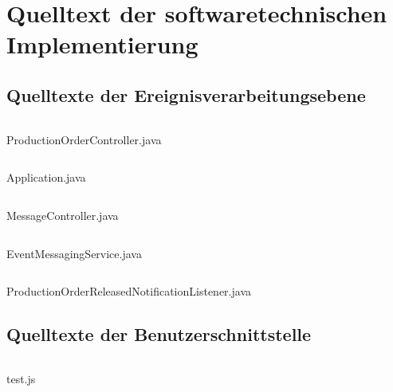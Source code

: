 \chapter{Quelltext der softwaretechnischen Implementierung}\label{ah:coding}

\tocless\section{Quelltexte der Ereignisverarbeitungsebene}\label{ah:approuter}

\begin{algorithm}[H]
\centering 
\inputminted[linenos]{java}{code/ProductionOrderController.java}
\caption{ProductionOrderController.java}
\label{code:EventMessagingService.java}
\end{algorithm}

\begin{algorithm}[H]
\centering 
\inputminted[linenos]{java}{code/Application.java}
\caption{Application.java}
\label{code:Application.java}
\end{algorithm}

\begin{algorithm}[H]
\centering 
\inputminted[linenos]{java}{code/MessageController.java}
\caption{MessageController.java}
\label{code:MessageController.java}
\end{algorithm}

\begin{algorithm}[H]
\centering 
\inputminted[linenos]{java}{code/EventMessagingService.java}
\caption{EventMessagingService.java}
\label{code:EventMessagingService.java}
\end{algorithm}

\begin{algorithm}[H]
\centering 
\inputminted[linenos]{java}{code/ProductionOrderReleasedNotificationListener.java}
\caption{ProductionOrderReleasedNotificationListener.java}
\label{code:EventMessagingService.java}
\end{algorithm}


\tocless\section{Quelltexte der Benutzerschnittstelle}\label{ah:frontend}

\begin{algorithm}[H]
\centering 
% 
\inputminted[linenos]{js}{code/test.js}
\caption{test.js}
\end{algorithm}

